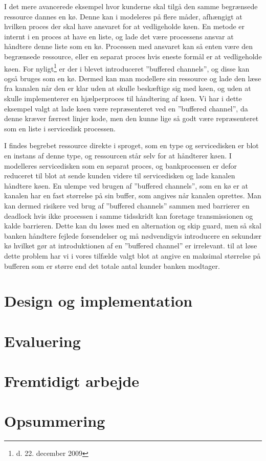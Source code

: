 I det mere avancerede eksempel hvor kunderne skal tilgå den samme begrænsede ressource dannes en kø. Denne kan i \pycsp modeleres på flere måder, afhængigt at hvilken proces der skal have ansvaret for at vedligeholde køen. En metode er internt i en proces at have en liste, og lade det være processens ansvar at håndtere denne liste som en kø. Processen med ansvaret kan så enten være den begrænsede ressource, eller en separat proces hvis eneste formål er at vedligeholde køen. For nyligt\footnote{d. 22. december 2009} er der i \pycsp blevet introduceret ''buffered channels''\cite{pycsp-r147}, og disse kan også bruges som en kø. Dermed kan man modellere sin ressource og lade den læse fra kanalen når den er klar uden at skulle beskæftige sig med køen, og uden at skulle implementerer en hjælperproces til håndtering af køen. Vi har i dette eksempel valgt at lade køen være repræsenteret ved en ''buffered channel'', da denne  kræver færrest linjer kode, men den kunne lige så godt være repræsenteret som en liste i servicedisk processen.

I \simpy findes begrebet ressource direkte i sproget, som en type og servicedisken er blot en instans af denne type, og ressourcen står selv for at håndterer køen. I \pycsp modelleres servicedisken som en separat proces, og bankprocessen er defor reduceret til blot at sende kunden videre til servicedisken og lade kanalen håndtere køen. En ulempe ved brugen af ''buffered channels'', som en kø er at kanalen har en fast størrelse på sin buffer, som angives når kanalen oprettes. Man kan dermed risikere ved brug af ''buffered channels'' sammen med barrierer en deadlock hvis ikke processen i samme tidsskridt kan foretage transmissionen og kalde barrieren. Dette kan du løses med en alternation og skip guard, men så skal banken håndtere fejlede forsendelser og må nødvendigvis introducere en sekundær kø hvilket gør at introduktionen af en ''buffered channel'' er irrelevant. til at løse dette problem har vi i vores tilfælde valgt blot at angive en maksimal størrelse på bufferen som er større end det totale antal kunder banken modtager.

  \section{Design og implementation}
  \section{Evaluering}
  \section{Fremtidigt arbejde}
  \section{Opsummering}
